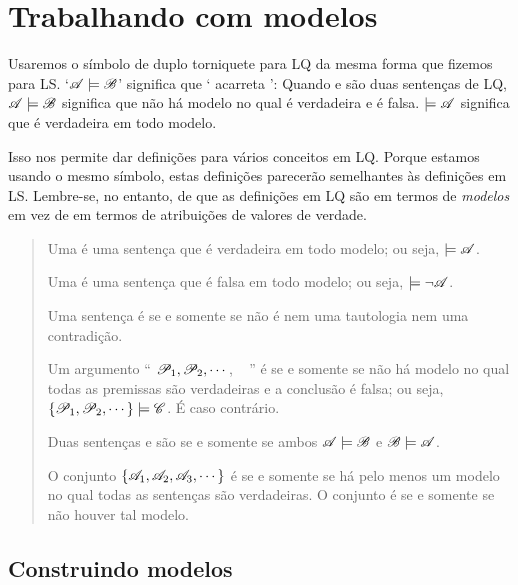 \section{Trabalhando com modelos}
\label{sec.UsingModels}

Usaremos o símbolo de duplo torniquete para LQ da mesma forma que fizemos para LS. `$\mathscr{A}\models\mathscr{B}$' significa que ` acarreta ': Quando  e  são duas sentenças de LQ, $\mathscr{A}\models\mathscr{B}$ significa que não há modelo no qual  é verdadeira e  é falsa. $\models\mathscr{A}$ significa que  é verdadeira em todo modelo.

Isso nos permite dar definições para vários conceitos em LQ. Porque estamos usando o mesmo símbolo, estas definições parecerão semelhantes às definições em LS. Lembre-se, no entanto, de que as definições em LQ são em termos de \emph{modelos} em vez de em termos de atribuições de valores de verdade.

\begin{quote}
Uma  é uma sentença  que é verdadeira em todo modelo; ou seja,  $\models\mathscr{A}$.

Uma  é uma sentença  que é falsa em todo modelo; ou seja, $\models\neg\mathscr{A}$.

Uma sentença é  se e somente se não é nem uma tautologia nem uma contradição.

Um argumento `` $\mathscr{P}_1, \mathscr{P}_2, \cdots$, \therefore\  '' é  se e somente se não há modelo no qual todas as premissas são verdadeiras e a conclusão é falsa; ou seja, $\{\mathscr{P}_1,\mathscr{P}_2,\cdots\}\models\mathscr{C}$. É  caso contrário.

Duas sentenças  e  são  se e somente se ambos $\mathscr{A}\models\mathscr{B}$ e $\mathscr{B}\models\mathscr{A}$.

O conjunto $\{\mathscr{A}_1,\mathscr{A}_2,\mathscr{A}_3,\cdots\}$ é  se e somente se há pelo menos um modelo no qual todas as sentenças são verdadeiras. O conjunto é  se e somente se não houver tal modelo.

\end{quote}

\subsection{Construindo modelos}

